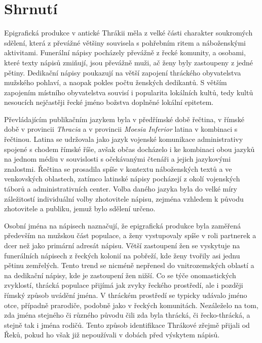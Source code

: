 \section[shrnutí-2]{Shrnutí}

Epigrafická produkce v antické Thrákii měla z velké části charakter soukromých sdělení, která z převážné většiny souvisela s pohřebním ritem a náboženskými aktivitami. Funerální nápisy pocházely převážně z řecké komunity, a osobami, které texty nápisů zmiňují, jsou převážně muži, ač ženy byly zastoupeny z jedné pětiny. Dedikační nápisy poukazují na větší zapojení thráckého obyvatelstva mužského pohlaví, a naopak pokles počtu ženských dedikantů. S větším zapojením místního obyvatelstva souvisí i popularita lokálních kultů, tedy kultů nesoucích nejčastěji řecké jméno božstva doplněné lokální epitetem.

Převládajícím publikačním jazykem byla v předřímské době řečtina, v římské době v provincii {\em Thracia} a v provincii {\em Moesia Inferior} latina v kombinaci s řečtinou. Latina se udržovala jako jazyk vojenské komunikace administrativy spojené s chodem římské říše, avšak občas docházelo i ke kombinaci obou jazyků na jednom médiu v souvislosti s očekávanými čtenáři a jejich jazykovými znalostmi. Řečtina se prosadila spíše v kontextu náboženských textů a ve venkovských oblastech, zatímco latinské nápisy pocházejí z okolí vojenských táborů a administrativních center. Volba daného jazyka byla do velké míry záležitostí individuální volby zhotovitele nápisu, zejména vzhledem k původu zhotovitele a publiku, jemuž bylo sdělení určeno.

Osobní jména na nápisech naznačují, že epigrafická produkce byla zaměřená především na mužskou část populace, a ženy vystupovaly spíše v roli partnerek a dcer než jako primární adresát nápisu. Větší zastoupení žen se vyskytuje na funerálních nápisech z řeckých kolonií na pobřeží, kde ženy tvořily asi jednu pětinu zemřelých. Tento trend se nicméně nepřenesl do vnitrozemských oblastí a na dedikační nápisy, kde je zastoupení žen nižší. Co se týče onomastických zvyklostí, thrácká populace přijímá jak zvyky řeckého prostředí, ale i později římský způsob uvádění jména. V thráckém prostředí se typicky udávalo jméno otce, případně prarodiče, podobně jako v řeckých komunitách. Nezáleželo na tom, zda jména stejného či různého původu čili zda byla thrácká, či řecko-thrácká, a stejně tak i jména rodičů. Tento způsob identifikace Thrákové zřejmě přijali od Řeků, pokud ho však již nepoužívali v dobách před výskytem nápisů.

